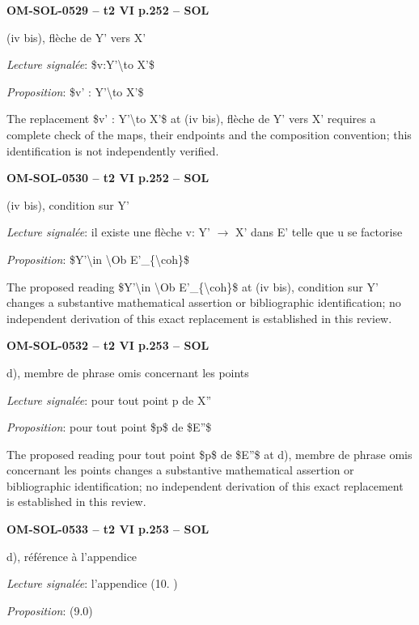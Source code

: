 \par\noindent\textbf{OM-SOL-0529 -- t2 VI p.252 -- SOL}\par
(iv bis), flèche de Y' vers X'\par
\emph{Lecture signalée}: \$v:Y'\textbackslash{}to X'\$\par
\emph{Proposition}: \$v' : Y'\textbackslash{}to X'\$\par
The replacement \$v' : Y'\textbackslash{}to X'\$ at (iv bis), flèche de Y' vers X' requires a complete check of the maps, their endpoints and the composition convention; this identification is not independently verified.\par
\par\noindent\textbf{OM-SOL-0530 -- t2 VI p.252 -- SOL}\par
(iv bis), condition sur Y'\par
\emph{Lecture signalée}: il existe une flèche v: Y' \ensuremath{\to} X' dans E' telle que u se factorise\par
\emph{Proposition}: \$Y'\textbackslash{}in \textbackslash{}Ob E'\_\{\textbackslash{}coh\}\$\par
The proposed reading \$Y'\textbackslash{}in \textbackslash{}Ob E'\_\{\textbackslash{}coh\}\$ at (iv bis), condition sur Y' changes a substantive mathematical assertion or bibliographic identification; no independent derivation of this exact replacement is established in this review.\par
\par\noindent\textbf{OM-SOL-0532 -- t2 VI p.253 -- SOL}\par
d), membre de phrase omis concernant les points\par
\emph{Lecture signalée}: pour tout point p de X''\par
\emph{Proposition}: pour tout point \$p\$ de \$E''\$\par
The proposed reading pour tout point \$p\$ de \$E''\$ at d), membre de phrase omis concernant les points changes a substantive mathematical assertion or bibliographic identification; no independent derivation of this exact replacement is established in this review.\par
\par\noindent\textbf{OM-SOL-0533 -- t2 VI p.253 -- SOL}\par
d), référence à l'appendice\par
\emph{Lecture signalée}: l'appendice (10. )\par
\emph{Proposition}: (9.0)\par

